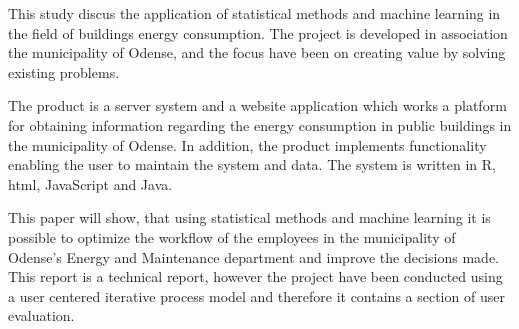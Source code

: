 This study discus the application of statistical methods and machine learning in the field of buildings energy consumption. The project is developed in association the municipality of Odense, and the focus have been on creating value by solving existing problems.

The product is a server system and a website application which works a platform for obtaining information regarding the energy consumption in public buildings in the municipality of Odense. In addition, the product implements functionality enabling the user to maintain the system and data. The system is written in R, html, JavaScript and Java.

This paper will show, that using statistical methods and machine learning it is possible to optimize the workflow of the employees in the municipality of Odense’s Energy and Maintenance department and improve the decisions made. 
\newline
\newline
This report is a technical report, however the project have been conducted using a user centered iterative process model and therefore it contains a section of user evaluation.  
